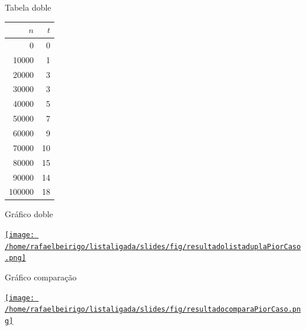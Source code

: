 \documentclass[bigger]{beamer}
\begin{document}
\begin{frame}[label=sec-3-2-5]{Tabela doble}
\begin{center}
\begin{tabular}{rr}
$n$ & $t$\\
\hline
0 & 0\\
10000 & 1\\
20000 & 3\\
30000 & 3\\
40000 & 5\\
50000 & 7\\
60000 & 9\\
70000 & 10\\
80000 & 15\\
90000 & 14\\
100000 & 18\\
\end{tabular}
\end{center}
\end{frame}
\begin{frame}[label=sec-3-2-6]{Gráfico doble}
\begin{center}
\href{fig/resultadolistaduplaPiorCaso-slides.png}{\texttt{[image: /home/rafaelbeirigo/listaligada/slides/fig/resultadolistaduplaPiorCaso.png]}}
\end{center}
\end{frame}
\begin{frame}[label=sec-3-2-7]{Gráfico comparação}
\begin{center}
\href{fig/resultadocomparaPiorCaso.png}{\texttt{[image: /home/rafaelbeirigo/listaligada/slides/fig/resultadocomparaPiorCaso.png]}}
\end{center}
\end{frame}
\end{document}
